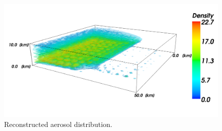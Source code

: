 \documentclass[10pt,twocolumn,letterpaper]{article}
\newcommand{\yoavcomment}[1]{}
\renewcommand{\yoavcomment}[1]{#1} %
\begin{document}
\begin{figure}
  \centering
  \yoavcomment{\includegraphics[width=\columnwidth]{images/recon2}}
  \caption{Reconstructed aerosol distribution.}
  \label{fig:synth-result2}
\end{figure}
\end{document}
